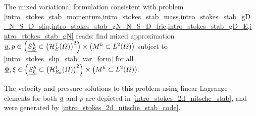 The mixed variational formulation  consistent with problem \cref{intro_stokes_stab_momentum,intro_stokes_stab_mass,intro_stokes_stab_gD_N_S_D_slip,intro_stokes_stab_gN_N_S_D_fric,intro_stokes_stab_gD_E,intro_stokes_stab_gN} reads: find mixed approximation $\underline{u}, p \in \left( \underline{S_E^h} \subset \left( \mathcal{H}_E^1(\varOmega) \right)^2 \right) \times \left( M^h \subset L^2(\varOmega) \right)$ subject to \cref{intro_stokes_slip_stab_var_form} for all $\underline{\Phi}, \xi \in \left(\underline{S_0^h} \subset \left( \mathcal{H}_{E_0}^1(\varOmega) \right)^2 \right) \times \left( M^h \subset L^2(\varOmega) \right)$.

The velocity and pressure solutions to this problem using linear Lagrange elements for both $\underline{u}$ and $p$ are depicted in \cref{intro_stokes_2d_nitsche_stab}, and were generated by \cref{intro_stokes_2d_nitsche_stab_code}.


